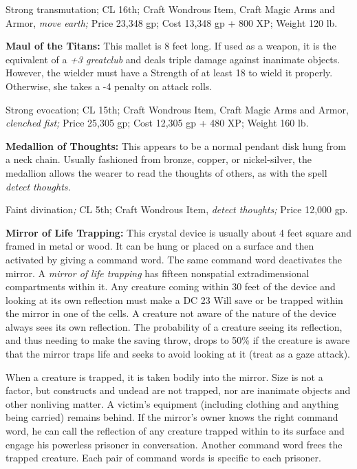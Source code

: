 Strong transmutation; CL 16th; Craft Wondrous Item, Craft Magic Arms and Armor, 
\textit{move earth; }Price 23,348 gp; Cost 13,348 gp + 800 XP; Weight 120 lb.

\textbf{Maul of the Titans:} This mallet is 8 feet long. If used as a weapon, it 
is the equivalent of a \textit{+3 greatclub }and deals triple damage against inanimate 
objects. However, the wielder must have a Strength of at least 18 to wield it properly. 
Otherwise, she takes a -4 penalty on attack rolls.

Strong evocation; CL 15th; Craft Wondrous Item, Craft Magic Arms and Armor, \textit{clenched 
fist; }Price 25,305 gp; Cost 12,305 gp + 480 XP; Weight 160 lb.

\textbf{Medallion of Thoughts:} This appears to be a normal pendant disk hung from 
a neck chain. Usually fashioned from bronze, copper, or nickel-silver, the medallion 
allows the wearer to read the thoughts of others, as with the spell \textit{detect 
thoughts.}

Faint divination\textit{; }CL 5th; Craft Wondrous Item, \textit{detect thoughts; 
}Price 12,000 gp.

\textbf{Mirror of Life Trapping:} This crystal device is usually about 4 feet square 
and framed in metal or wood. It can be hung or placed on a surface and then activated 
by giving a command word. The same command word deactivates the mirror. A \textit{mirror 
of life trapping }has fifteen nonspatial extradimensional compartments within it. 
Any creature coming within 30 feet of the device and looking at its own reflection 
must make a DC 23 Will save or be trapped within the mirror in one of the cells. 
A creature not aware of the nature of the device always sees its own reflection. 
The probability of a creature seeing its reflection, and thus needing to make the 
saving throw, drops to 50\% if the creature is aware that the mirror traps life 
and seeks to avoid looking at it (treat as a gaze attack).

When a creature is trapped, it is taken bodily into the mirror. Size is not a factor, 
but constructs and undead are not trapped, nor are inanimate objects and other 
nonliving matter. A victim's equipment (including clothing and anything being carried) 
remains behind. If the mirror's owner knows the right command word, he can call 
the reflection of any creature trapped within to its surface and engage his powerless 
prisoner in conversation. Another command word frees the trapped creature. Each 
pair of command words is specific to each prisoner.

